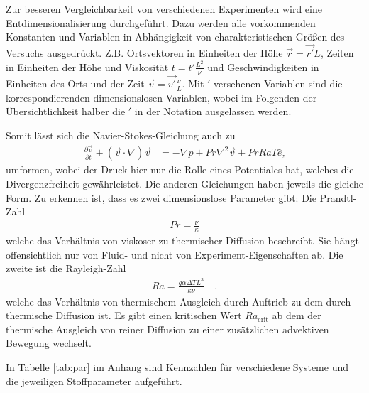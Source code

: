 \documentclass[12pt,a4paper,titlepage,headinclude]{scrartcl}
\numberwithin{equation}{subsection}
\begin{document}
Zur besseren Vergleichbarkeit von verschiedenen Experimenten wird eine Entdimensionalisierung durchgeführt.
Dazu werden alle vorkommenden Konstanten und Variablen in Abhängigkeit von charakteristischen Größen des Versuchs ausgedrückt.
Z.B. Ortsvektoren in Einheiten der Höhe $\vec{r}=\vec{r'} L$, Zeiten in Einheiten der Höhe und Viskosität $t=t' \frac{L^2}{\nu}$ und Geschwindigkeiten in Einheiten des Orts und der Zeit $\vec{v}=\vec{v'}\frac{\nu}{L}$.
Mit $'$ versehenen Variablen sind die korrespondierenden dimensionslosen Variablen, wobei im Folgenden der \"Ubersichtlichkeit halber die $'$ in der Notation ausgelassen werden.

Somit lässt sich die Navier-Stokes-Gleichung auch zu
\begin{align}
	\frac{\partial \vec{v}}{\partial t}+\left( \vec{v}\cdot\nabla \right)\vec{v} &= -\nabla p + Pr\nabla^2\vec{v}+PrRaT\hat{e}_z
\end{align}
umformen, wobei der Druck hier nur die Rolle eines Potentiales hat, welches die Divergenzfreiheit gewährleistet.
Die anderen Gleichungen haben jeweils die gleiche Form.
Zu erkennen ist, dass es zwei dimensionslose Parameter gibt:
Die Prandtl-Zahl
\begin{align}
	Pr=\frac{\nu}{\kappa}\label{eq:Pr}
\end{align}
welche das Verhältnis von viskoser zu thermischer Diffusion beschreibt.
Sie hängt offensichtlich nur von Fluid- und nicht von Experiment-Eigenschaften ab.
Die zweite ist die Rayleigh-Zahl
\begin{align}
	Ra=\frac{g\alpha\Delta T L^3}{\kappa\nu}\quad.\label{eq:Ra}
\end{align}
welche das Verhältnis von thermischem Ausgleich durch Auftrieb zu dem durch thermische Diffusion ist.
Es gibt einen kritischen Wert $Ra_\text{crit}$ ab dem der thermische Ausgleich von reiner Diffusion zu einer zusätzlichen advektiven Bewegung wechselt.

In Tabelle \ref{tab:par} im Anhang sind Kennzahlen für verschiedene Systeme und die jeweiligen Stoffparameter aufgeführt.
\end{document}
